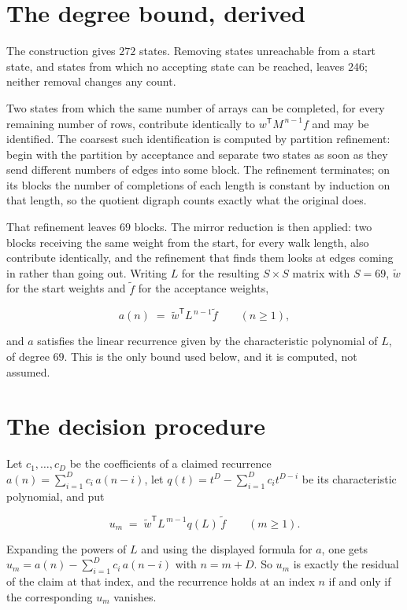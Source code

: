 \documentclass[11pt]{article}
\theoremstyle{definition}
\begin{document}
\section{The degree bound, derived}

The construction gives $272$ states. Removing states unreachable from a start state, and states from which no accepting state can be reached, leaves $246$; neither removal changes any count.

Two states from which the same number of arrays can be completed, for every remaining number of rows, contribute identically to $w^{\mathsf T}M^{\,n-1}f$ and may be identified. The coarsest such identification is computed by partition refinement: begin with the partition by acceptance and separate two states as soon as they send different numbers of edges into some block. The refinement terminates; on its blocks the number of completions of each length is constant by induction on that length, so the quotient digraph counts exactly what the original does.

That refinement leaves $69$ blocks. The mirror reduction is then applied: two blocks receiving the same weight from the start, for every walk length, also contribute identically, and the refinement that finds them looks at edges coming in rather than going out. Writing $L$ for the resulting $S \times S$ matrix with $S = 69$, $\tilde w$ for the start weights and $\tilde f$ for the acceptance weights,

\[a(n) \;=\; \tilde w^{\mathsf T} L^{\,n-1} \tilde f \qquad (n \ge 1),\]

and $a$ satisfies the linear recurrence given by the characteristic polynomial of $L$, of degree $69$. This is the only bound used below, and it is computed, not assumed.

\section{The decision procedure}

Let $c_1,\dots,c_D$ be the coefficients of a claimed recurrence $a(n) = \sum_{i=1}^{D} c_i\,a(n-i)$, let $q(t) = t^{D} - \sum_{i=1}^{D} c_i t^{D-i}$ be its characteristic polynomial, and put

\[u_m \;=\; \tilde w^{\mathsf T} L^{\,m-1} q(L)\,\tilde f \qquad (m \ge 1).\]

Expanding the powers of $L$ and using the displayed formula for $a$, one gets $u_m = a(n) - \sum_{i=1}^{D} c_i\,a(n-i)$ with $n = m + D$. So $u_m$ is exactly the residual of the claim at that index, and the recurrence holds at an index $n$ if and only if the corresponding $u_m$ vanishes.
\end{document}
